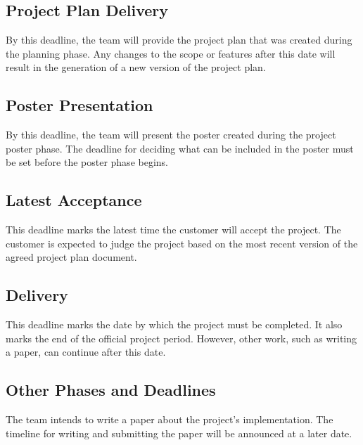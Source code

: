 \subsection{Project Plan Delivery}
By this deadline, the team will provide the project plan that was created during the planning phase. Any changes to the scope or features after this date will result in the generation of a new version of the project plan.

\subsection{Poster Presentation}
By this deadline, the team will present the poster created during the project poster phase. The deadline for deciding what can be included in the poster must be set before the poster phase begins.

\subsection{Latest Acceptance}
This deadline marks the latest time the customer will accept the project. The customer is expected to judge the project based on the most recent version of the agreed project plan document.

\subsection{Delivery}
This deadline marks the date by which the project must be completed. It also marks the end of the official project period. However, other work, such as writing a paper, can continue after this date.

\subsection{Other Phases and Deadlines}
The team intends to write a paper about the project's implementation. The timeline for writing and submitting the paper will be announced at a later date.
